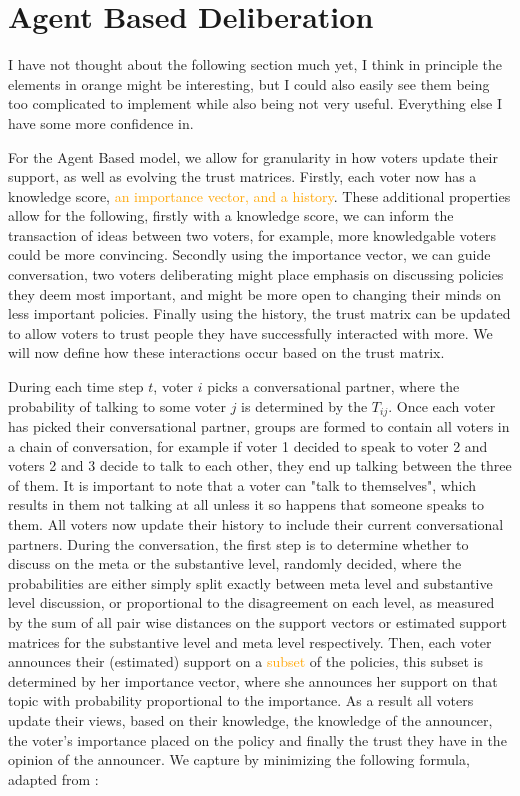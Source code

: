 \section{Agent Based Deliberation}
\textcolor{RedViolet}{I have not thought about the following section much yet, I think in principle the elements in orange might be interesting, but I could also easily see them being too complicated to implement while also being not very useful. Everything else I have some more confidence in.}

For the Agent Based model, we allow for granularity in how voters update their support, as well as evolving the trust matrices. Firstly, each voter now has a knowledge score, \textcolor{orange}{an importance vector, and a history}. These additional properties allow for the following, firstly with a knowledge score, we can inform the transaction of ideas between two voters, for example, more knowledgable voters could be more convincing. Secondly using the importance vector, we can guide conversation, two voters deliberating might place emphasis on discussing policies they deem most important, and might be more open to changing their minds on less important policies. Finally using the history, the trust matrix can be updated to allow voters to trust people they have successfully interacted with more. We will now define how these interactions occur based on the trust matrix.


During each time step $t$, voter $i$ picks a conversational partner, where the probability of talking to some voter $j$ is determined by the $T_{ij}$. Once each voter has picked their conversational partner, groups are formed to contain all voters in a chain of conversation, for example if voter 1 decided to speak to voter 2 and voters 2 and 3 decide to talk to each other, they end up talking between the three of them. It is important to note that a voter can "talk to themselves", which results in them not talking at all unless it so happens that someone speaks to them. All voters now update their history to include their current conversational partners. During the conversation, the first step is to determine whether to discuss on the meta or the substantive level, randomly decided, where the probabilities are either simply split exactly between meta level and substantive level discussion, or proportional to the disagreement on each level, as measured by the sum of all pair wise distances on the support vectors or estimated support matrices for the substantive level and meta level respectively.
Then, each voter announces their (estimated) support on a \textcolor{orange}{subset} of the policies, this subset is determined by her importance vector, where she announces her support on that topic with probability proportional to the importance. As a result all voters update their views, based on their knowledge, the knowledge of the announcer, the voter's importance placed on the policy and finally the trust they have in the opinion of the announcer. We capture by minimizing the following formula, adapted from \citet{radDeliberationSinglePeakednessCoherent2021}:

